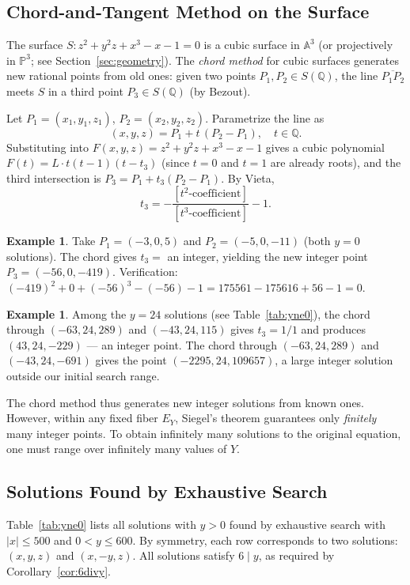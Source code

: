 \documentclass[12pt,a4paper]{article}
\theoremstyle{definition}
\newtheorem{example}[theorem]{Example}
\newcommand{\Q}{\mathbb{Q}}
\newcommand{\A}{\mathbb{A}}
\newcommand{\Pbb}{\mathbb{P}}
\begin{document}
\subsection{Chord-and-Tangent Method on the Surface}

The surface $S:z^2+y^2z+x^3-x-1=0$ is a cubic surface in $\A^3$
(or projectively in $\Pbb^3$; see Section~\ref{sec:geometry}).  The
\emph{chord method} for cubic surfaces generates new rational points from
old ones: given two points $P_1,P_2\in S(\Q)$, the line $\overline{P_1P_2}$
meets $S$ in a third point $P_3\in S(\Q)$ (by Bezout).

Let $P_1 = (x_1,y_1,z_1)$, $P_2=(x_2,y_2,z_2)$.  Parametrize the line as
\[
  (x,y,z) = P_1 + t\,(P_2-P_1),\quad t\in\Q.
\]
Substituting into $F(x,y,z)=z^2+y^2z+x^3-x-1$ gives a cubic polynomial
$F(t) = L\cdot t(t-1)(t-t_3)$ (since $t=0$ and $t=1$ are already roots), and
the third intersection is $P_3 = P_1 + t_3(P_2-P_1)$.  By Vieta,
\[
  t_3 = -\frac{[t^2\text{-coefficient}]}{[t^3\text{-coefficient}]} - 1.
\]

\begin{example}
  Take $P_1 = (-3,0,5)$ and $P_2 = (-5,0,-11)$ (both $y=0$ solutions).
  The chord gives $t_3 = $ an integer, yielding the new integer point
  $P_3 = (-56, 0, -419)$.  Verification: $(-419)^2 + 0 + (-56)^3 -(-56)-1
  = 175561 - 175616 + 56 - 1 = 0$. \checkmark
\end{example}

\begin{example}
  Among the $y=24$ solutions (see Table~\ref{tab:yne0}), the chord through
  $(-63,24,289)$ and $(-43,24,115)$ gives $t_3 = 1/1$ and produces
  $(43,24,-229)$ — an integer point.  The chord through $(-63,24,289)$ and
  $(-43,24,-691)$ gives the point $(-2295,24,109657)$, a large integer
  solution outside our initial search range.
\end{example}

\noindent
The chord method thus generates new integer solutions from known ones.
However, within any fixed fiber $E_Y$, Siegel's theorem guarantees only
\emph{finitely} many integer points.  To obtain infinitely many solutions to
the original equation, one must range over infinitely many values of $Y$.

\subsection{Solutions Found by Exhaustive Search}

Table~\ref{tab:yne0} lists all solutions with $y > 0$ found by exhaustive
search with $|x|\le 500$ and $0 < y \le 600$.  By symmetry, each row
corresponds to two solutions: $(x,y,z)$ and $(x,-y,z)$.  All solutions satisfy
$6\mid y$, as required by Corollary~\ref{cor:6divy}.
\end{document}
